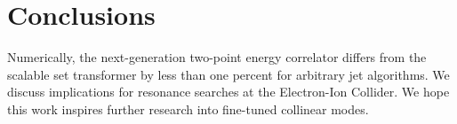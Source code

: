 \section{Conclusions}\label{sec:conclusions}

Numerically, the next-generation two-point energy correlator differs
from the scalable set transformer by less than one percent for arbitrary
jet algorithms. We discuss implications for resonance searches at the
Electron-Ion Collider. We hope this work inspires further research into
fine-tuned collinear modes.

